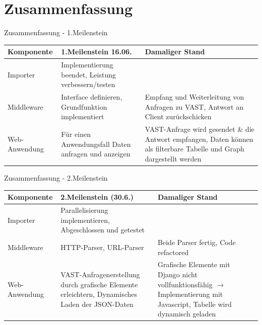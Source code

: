 \documentclass[9pt]{beamer}
\begin{document}
\section{Zusammenfassung	}

\begin{frame}{Zusammenfassung - 1.Meilenstein}

	\begin{table}[h!]
	\centering
	\begin{tabular}{p{5em} p{12em} p{14em}}
		\textbf{Komponente} & \textbf{1.Meilenstein 16.06.} & \textbf{Damaliger Stand} \\ \midrule
		Importer & Implementierung beendet, Leistung verbessern/testen &  \\ \midrule
		Middleware & Interface definieren, Grundfunktion implementiert & Empfang und Weiterleitung von Anfragen zu VAST, Antwort an Client zurückschicken \\ \midrule
		Web-Anwendung & Für einen Anwendungsfall Daten anfragen und anzeigen & VAST-Anfrage wird gesendet \& die Antwort empfangen, Daten können als filterbare Tabelle und Graph dargestellt werden \\ \bottomrule
	\end{tabular}
	\end{table}
\end{frame}

\begin{frame}{Zusammenfassung - 2.Meilenstein}
	\begin{table}[h!]
	\centering
	\begin{tabular}{p{5em} p{12em} p{14em}}
		\textbf{Komponente} & \textbf{2.Meilenstein (30.6.)} & \textbf{Damaliger Stand} \\ \midrule
		Importer & Parallelisierung implementieren, Abgeschlossen und getestet &  \\ \midrule
		Middleware & HTTP-Parser, URL-Parser	& Beide Parser fertig, Code refactored\\ \midrule
		Web-Anwendung &  VAST-Anfragenerstellung durch grafische Elemente erleichtern, Dynamisches Laden der JSON-Daten & Grafische Elemente mit Django nicht vollfunktionsfähig $\rightarrow$ Implementierung mit Javascript, Tabelle wird dynamisch geladen \\ \bottomrule
	\end{tabular}
	\end{table}
\end{frame}
\end{document}
